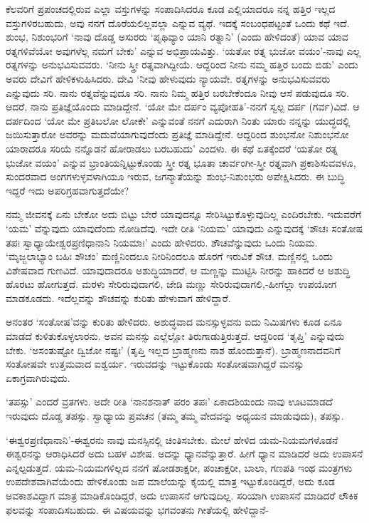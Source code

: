 ಕೆಲವರಿಗೆ ಪ್ರಪಂಚದಲ್ಲಿರುವ ಎಲ್ಲಾ ವಸ್ತುಗಳನ್ನು ಸಂಪಾದಿಸಿದರೂ ಕೂಡ ಎಲ್ಲಿಯಾದರೂ ನನ್ನ ಹತ್ತಿರ ಇಲ್ಲದ ವಸ್ತುಗಳಿರಬಹುದು, ಅವು ನನಗೆ ದೊರೆಯಲಿಲ್ಲವಲ್ಲಾ ಎನ್ನುವ ವ್ಯಥೆ. ಇದಕ್ಕೆ ಸಂಬಂಧಪಟ್ಟಂತೆ ಒಂದು ಕಥೆ ಇದೆ. ಶುಂಭ, ನಿಶುಂಭರಿಗೆ `ನಾವು ದೊಡ್ಡ ಅಸುರರು `ಪೃಥಿವ್ಯಾಂ ಯಾನಿ ರತ್ನಾನಿ' (ಎಂದು ಹೇಳಿದಂತೆ) ಯಾವ ಯಾವ ರತ್ನಗಳಿವೆಯೋ ಅವುಗಳೆಲ್ಲ ನಮಗೆ ಬೇಕು' ಎನ್ನುವ ಅಭಿಪ್ರಾಯವಿತ್ತು. `ಯತೋ ರತ್ನ ಭುಜೋ ವಯಂ'-ನಾವು ಎಲ್ಲ ರತ್ನಗಳನ್ನು ಅನುಭವಿಸುವವರು. `ನೀನು ಸ್ತ್ರೀ ರತ್ನವಾಗಿದ್ದೀಯೆ. ಆದ್ದರಿಂದ ನೀನು ನಮ್ಮ ಹತ್ತಿರ ಬಂದು ಬಿಡು' ಎಂದು ಅವರು ದೇವಿಗೆ ಹೇಳಿಕಳುಹಿಸಿದರು. ದೇವಿ `ನೀವು ಹೇಳುವುದು ನ್ಯಾಯವೇ. ರತ್ನಗಳನ್ನು ಅನುಭವಿಸುವವರು ಎನ್ನುವುದು ಸರಿ. ನಾನು ರತ್ನವೆನ್ನುವುದೂ ಸರಿ. ನಾನು ನಿಮ್ಮ ಹತ್ತಿರ ಬರಬೇಕೆಂದೂ ನೀವು ಆಸೆ ಪಡುವುದೂ ಸರಿ. ಆದರೆ, ನಾನು ಪ್ರತಿಜ್ಞೆಯೊಂದು ಮಾಡಿದ್ದೇನೆ. `ಯೋ ಮೇ ದರ್ಪಂ ವ್ಯಪೋಹತಿ'-ನನಗೆ ಸ್ವಲ್ಪ ದರ್ಪ (ಗರ್ವ)ವಿದೆ. ಆ ದರ್ಪದಿಂದ `ಯೋ ಮೇ ಪ್ರತಿಬಲೋ ಲೋಕೇ' ಎನ್ನುವಂತೆ ನನಗೆ ಎದುರಾಗಿ ನಿಂತು ಯಾರು ನನ್ನನ್ನು ಯುದ್ಧದಲ್ಲಿ ಜಯಿಸುತ್ತಾರೋ ಅವರನ್ನು ಮದುವೆಯಾಗುವುದೆಂದು ಪ್ರತಿಜ್ಞೆ ಮಾಡಿದ್ದೇನೆ. ಆದ್ದರಿಂದ ಶುಂಭನೋ ನಿಶುಂಭನೋ ಯಾರಾದರೂ ಸರಿಯೆ ನನ್ನೊಡನೆ ಹೋರಾಡಲು ಬರಬಹುದು' ಎಂದಳು. ಈ ಕಥೆ ಏತಕ್ಕೆಂದರೆ `ಯತೋ ರತ್ನ ಭುಜೋ ವಯಂ' ಎನ್ನುವ ಭ್ರಾಂತಿಯನ್ನಿಟ್ಟುಕೊಂಡು ಸ್ತ್ರೀ ರತ್ನ ಭೂತಾ ಚಾರ್ವಂಗೀ-ಸ್ತ್ರೀ ರತ್ನವಾಗಿ ಪ್ರಕಾಶಿಸುವವಳೂ, ಸುಂದರವಾದ ಅಂಗಗಳುಳ್ಳವಳಾಗಿಯೂ ಇರುವ, ಜಗನ್ಮಾತೆಯನ್ನು ಶುಂಭ-ನಿಶುಂಭರು ಅಪೇಕ್ಷಿಸಿದರು. ಈ ಬುದ್ಧಿ ಇದ್ದರೆ ಇದು ಅಪರಿಗ್ರಹವಾಗುತ್ತದೆಯೇ?

ನಮ್ಮ ಜೀವನಕ್ಕೆ ಏನು ಬೇಕೋ ಅದು ಬಿಟ್ಟು ಬೇರೆ ಯಾವುದನ್ನೂ ಸೇರಿಸಿಟ್ಟುಕೊಳ್ಳುವುದಿಲ್ಲ ಎಂದಿರಬೇಕು. ಇದುವರೆಗೆ `ಯಮ' ವೆನ್ನುವುದು ಯಾವುದೆಂದು ನೋಡಿದೆವು. ಇದೇ ರೀತಿ `ನಿಯಮ' ಯಾವುದು ಎನ್ನುವುದಕ್ಕೆ `ಶೌಚಃ ಸಂತೋಷ ತಪಃ ಸ್ವಾಧ್ಯಾಯೇಶ್ವರಪ್ರಣಿಧಾನಾನಿ ನಿಯಮಾಃ' ಎಂದು ಹೇಳಿದರು. ಶೌಚವೆನ್ನುವುದು ಒಂದು ನಿಯಮ. `ಮೃಜ್ಜಲಾಭ್ಯಾಂ ಬಹಿಃ ಶೌಚಂ' ಮಣ್ಣಿನಿಂದಲೂ ನೀರಿನಿಂದಲೂ ಹೊರಗೆ ಇರುವಿಕೆ ಶೌಚ. ಮಣ್ಣಿನಲ್ಲಿ ಒಂದು ವಿಶೇಷವಾದ ಗುಣವಿದೆ. ಯಾವುದಾದರೂ ಅಶುದ್ಧಿಯಾದರೆ, ಆ ಮಣ್ಣನ್ನು ಮುಟ್ಟಿಸಿ ನೀರನ್ನು ಹಾಕಿದರೆ ಆ ಅಶುದ್ಧಿ ಹೊರಟು ಹೋಗುತ್ತದೆ. ಮರಳು ಸೇರಿರುವುದಾಗಲಿ, ಜೇಡಿ ಮಣ್ಣು ಸೇರಿರುವುದಾಗಲಿ,-ಹೀಗೆಲ್ಲಾ ಉಪಯೋಗ ಮಾಡಕೂಡದು. ಇದೆಲ್ಲವನ್ನು ಶೌಚವನ್ನು ಕುರಿತು ಹೇಳುವಾಗ ಹೇಳಿದ್ದಾರೆ.

ಅನಂತರ `ಸಂತೋಷ'ವನ್ನು ಕುರಿತು ಹೇಳಿದರು. ಅಶುದ್ಧವಾದ ಮನಸ್ಸುಳ್ಳವನು ಐದು ನಿಮಿಷಗಳು ಕೂಡ ಏನೂ ಮಾಡದೆ ಕುಳಿತುಕೊಳ್ಳಲಾರನು. ಅವನ ಮನಸ್ಸು ಎಲ್ಲೆಲ್ಲೋ ತಿರುಗಾಡುತ್ತಿರುತ್ತದೆ. ಆದ್ದರಿಂದ `ತೃಪ್ತಿ' ಎನ್ನುವುದು ಬೇಕು. `ಅಸಂತುಷ್ಟೋ ದ್ವಿಜೋ ನಷ್ಟಃ' (ತೃಪ್ತಿ ಇಲ್ಲದ ಬ್ರಾಹ್ಮಣನು ನಾಶ ಹೊಂದುತ್ತಾನೆ). ಬ್ರಾಹ್ಮಣನಾದವನಿಗೆ ಸಂತೋಷವೇ ಉತ್ತಮವಾದ ಐಶ್ವರ್ಯ. ಇರುವದನ್ನು ಇಟ್ಟುಕೊಂಡು ಸಂತೋಷವಾಗಿದ್ದರೆ ಮನಸ್ಸು ಏಕಾಗ್ರವಾಗಿರುವುದು.

`ತಪಸ್ಸು' ಎಂದರೆ ವ್ರತಗಳು. ಅದೇ ರೀತಿ `ನಾನಶನಾತ್ ಪರಂ ತಪಃ' ಏಕಾದಶಿಯಂದು ನಾವು ಊಟಮಾಡದೆ ಇರುವುದು ದೊಡ್ಡ ತಪಸ್ಸು. ಸ್ವಾಧ್ಯಾಯ ಪ್ರವಚನ (ತಮ್ಮ ತಮ್ಮ ವೇದವನ್ನು ಅಧ್ಯಯನ ಮಾಡುವುದು), ತಪಸ್ಸು.

`ಈಶ್ವರಪ್ರಣಿಧಾನಾನಿ'-ಈಶ್ವರನು ನಾವು ಮನಸ್ಸಿನಲ್ಲಿ ಚಿಂತಿಸಬೇಕು. ಮೇಲೆ ಹೇಳಿದ ಯಮ-ನಿಯಮಗಳೊಡನೆ ಈಶ್ವರನನ್ನು ಆರಾಧಿಸಿದರೆ ಅದು ಬಹಳ ವಿಶೇಷ. ಅದನ್ನು ಧ್ಯಾನವೆನ್ನುತ್ತಾರೆ. ಹೀಗೆ ಧ್ಯಾನ ಮಾಡಿದರೆ ಅದು ಉಪಾಸನೆ ಎನ್ನಲ್ಪಡುತ್ತದೆ. ಯಮ-ನಿಯಮಗಳಿಲ್ಲದ ನನಗೆ ಷೋಡಶಾಕ್ಷರೀ, ಪಂಚಾಕ್ಷರೀ, ಬಾಲಾ, ಗಣಪತಿ ಇಂಥ ಮಂತ್ರಗಳು ಉಪದೇಶವಾಗಿವೆಯೆಂದು ಹೇಳಿಕೊಂಡು ಜಪ ಮಾಲೆಯನ್ನು ಕೈಯಲ್ಲಿ ಮಾತ್ರ ಇಟ್ಟುಕೊಂಡಿದ್ದರೆ, ಅದು ಕೂಡ ಅವಕಾಶವಿದ್ದಾಗ ಮಾತ್ರ ಮಾಡಿಕೊಂಡಿದ್ದರೆ, ಅದು ಉಪಾಸನೆ ಆಗುವುದಿಲ್ಲ. ಸರಿಯಾಗಿ ಉಪಾಸನೆ ಮಾಡಿದರೆ ಲೌಕಿಕ ಫಲವನ್ನು ಸಂಪಾದಿಸಬಹುದು. ಈ ವಿಷಯವನ್ನು ಭಗವಂತನು ಗೀತೆಯಲ್ಲಿ ಹೇಳಿದ್ದಾನೆ-

